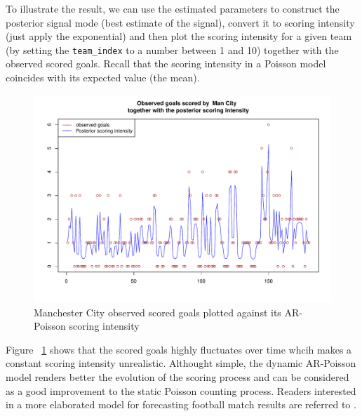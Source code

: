 \documentclass{article}
\begin{document}
To illustrate the result, we can use the estimated parameters to construct the posterior
signal mode (best estimate of the signal), convert it to scoring intensity (just apply the
exponential) and then plot the scoring intensity for a given team (by setting the
\texttt{team_index} to a number between 1 and 10) together with the observed scored
goals. Recall that the scoring intensity in a Poisson model coincides with its expected value
(the mean).
\begin{Schunk}
\end{Schunk}

\begin{figure}[htbp]
  \centering
 \includegraphics{intensity.pdf}
\caption{Manchester City observed scored goals plotted against its AR-Poisson scoring intensity}
\label{fig:SCIntensityVSObserved}
\end{figure}

Figure ~\ref{fig:SCIntensityVSObserved} shows that the scored goals highly fluctuates over
time whcih makes a constant scoring intensity unrealistic. Althought simple, the dynamic
AR-Poisson model renders better the evolution of the scoring process and can be considered as
a good improvement to the static Poisson counting process. Readers interested in a more
elaborated model for forecasting football match results are referred to
\citet{koopman2013dynamic}.
\end{document}
